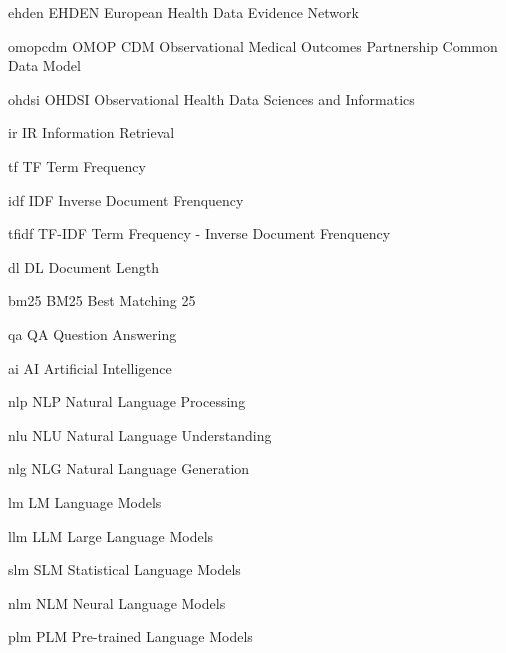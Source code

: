 
\newabbreviation
    {ehden}
    {EHDEN}
    {European Health Data Evidence Network}
\newcommand{\ehden}{\gls{ehden}}

\newabbreviation
    {omopcdm}
    {OMOP CDM}
    {Observational Medical Outcomes Partnership Common Data Model}
\newcommand{\omop}{\gls{omopcdm}}

\newabbreviation
    {ohdsi}
    {OHDSI}
    {Observational Health Data Sciences and Informatics}
\newcommand{\ohdsi}{\gls{ohdsi}}

\newabbreviation
    {ir}
    {IR}
    {Information Retrieval}
\newcommand{\ir}{\gls{ir}}

\newabbreviation
    {tf}
    {TF}
    {Term Frequency}
\newcommand{\tf}{\gls{tf}}

\newabbreviation
    {idf}
    {IDF}
    {Inverse Document Frenquency}
\newcommand{\idf}{\gls{idf}}

\newabbreviation
    {tfidf}
    {TF-IDF}
    {Term Frequency - Inverse Document Frenquency}
\newcommand{\tfidf}{\gls{tfidf}}

\newabbreviation
    {dl}
    {DL}
    {Document Length}
\newcommand{\dl}{\gls{dl}}

\newabbreviation
    {bm25}
    {BM25}
    {Best Matching 25}
\newcommand{\bm}{\gls{bm25}}

\newabbreviation
    {qa}
    {QA}
    {Question Answering}
\newcommand{\qa}{\gls{qa}}

\newabbreviation
    {ai}
    {AI}
    {Artificial Intelligence}
\newcommand{\ai}{\gls{ai}}

\newabbreviation
    {nlp}
    {NLP}
    {Natural Language Processing}
\newcommand{\nlp}{\gls{nlp}}

\newabbreviation
    {nlu}
    {NLU}
    {Natural Language Understanding}
\newcommand{\nlu}{\gls{nlu}}

\newabbreviation
    {nlg}
    {NLG}
    {Natural Language Generation}
\newcommand{\nlg}{\gls{nlg}}

\newabbreviation
    {lm}
    {LM}
    {Language Models}
\newcommand{\lm}{\gls{lm}}

\newabbreviation
    {llm}
    {LLM}
    {Large Language Models}
\newcommand{\llm}{\gls{llm}}

\newabbreviation
    {slm}
    {SLM}
    {Statistical Language Models}
\newcommand{\slm}{\gls{slm}}

\newabbreviation
    {nlm}
    {NLM}
    {Neural Language Models}
\newcommand{\nlm}{\gls{nlm}}

\newabbreviation
    {plm}
    {PLM}
    {Pre-trained Language Models}
\newcommand{\plm}{\gls{plm}}

